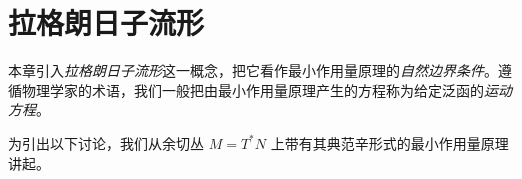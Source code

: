 \chapter{拉格朗日子流形}
\label{ch:lagrangian-submanifolds}

本章引入\emph{拉格朗日子流形}这一概念，把它看作最小作用量原理的\emph{自然边界条件}。遵循物理学家的术语，我们一般把由最小作用量原理产生的方程称为给定泛函的\emph{运动方程}。

为引出以下讨论，我们从余切丛 $M=T^*N$ 上带有其典范辛形式的最小作用量原理讲起。










